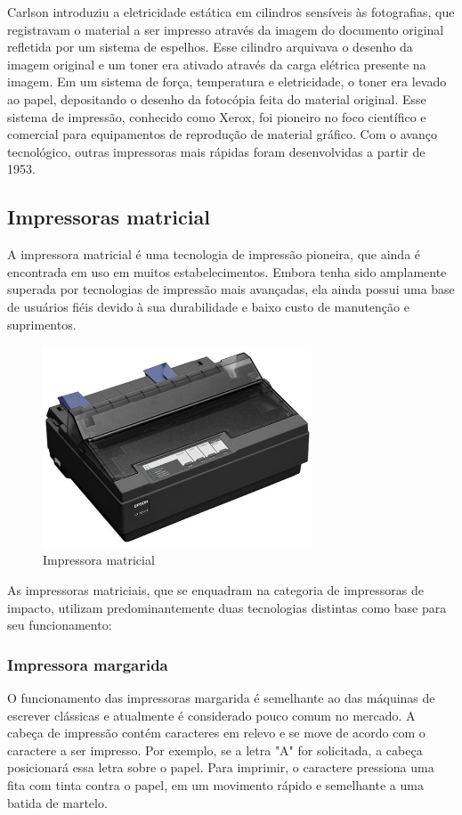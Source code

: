 \documentclass[12pt,a4, oneside, brazil]{article}
\begin{document}
		Carlson introduziu a eletricidade estática em cilindros sensíveis às fotografias, que registravam o material a ser impresso através da imagem do documento original refletida por um sistema de espelhos. Esse cilindro arquivava o desenho da imagem original e um toner era ativado através da carga elétrica presente na imagem. Em um sistema de força, temperatura e eletricidade, o toner era levado ao papel, depositando o desenho da fotocópia feita do material original. Esse sistema de impressão, conhecido como Xerox, foi pioneiro no foco científico e comercial para equipamentos de reprodução de material gráfico. Com o avanço tecnológico, outras impressoras mais rápidas foram desenvolvidas a partir de 1953.
		
		\subsection{Impressoras matricial}
		A impressora matricial é uma tecnologia de impressão pioneira, que ainda é encontrada em uso em muitos estabelecimentos. Embora tenha sido amplamente superada por tecnologias de impressão mais avançadas, ela ainda possui uma base de usuários fiéis devido à sua durabilidade e baixo custo de manutenção e suprimentos.
		
		\begin{figure}[H]
			\centering
			\includegraphics[width=8cm]{matricial}
			\caption{Impressora matricial}
			\label{fig:monomodo}
		\end{figure}
	
		As impressoras matriciais, que se enquadram na categoria de impressoras de impacto, utilizam predominantemente duas tecnologias distintas como base para seu funcionamento:
			\subsubsection{Impressora margarida}
			O funcionamento das impressoras margarida é semelhante ao das máquinas de escrever clássicas e atualmente é considerado pouco comum no mercado. A cabeça de impressão contém caracteres em relevo e se move de acordo com o caractere a ser impresso. Por exemplo, se a letra "A" for solicitada, a cabeça posicionará essa letra sobre o papel. Para imprimir, o caractere pressiona uma fita com tinta contra o papel, em um movimento rápido e semelhante a uma batida de martelo.
			
\end{document}
